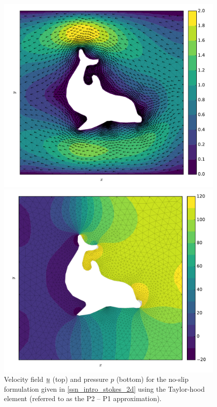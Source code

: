 
\begin{figure}
  \centering
  \begin{minipage}[b]{0.60\linewidth}
    \includegraphics[width=\linewidth]{images/fenics_intro/2Dstokes_u.pdf}
  \end{minipage}
  \quad
  \begin{minipage}[b]{0.60\linewidth}
    \includegraphics[width=\linewidth]{images/fenics_intro/2Dstokes_p.pdf}
  \end{minipage}
  \caption[Two-dimensional-no-slip Stokes example]{Velocity field $\underline{u}$ (top) and pressure $p$ (bottom) for the no-slip formulation given in \cref{ssn_intro_stokes_2d} using the Taylor-hood element (referred to as the P2 -- P1 approximation).}
  \label{intro_stokes_2d}
\end{figure}

